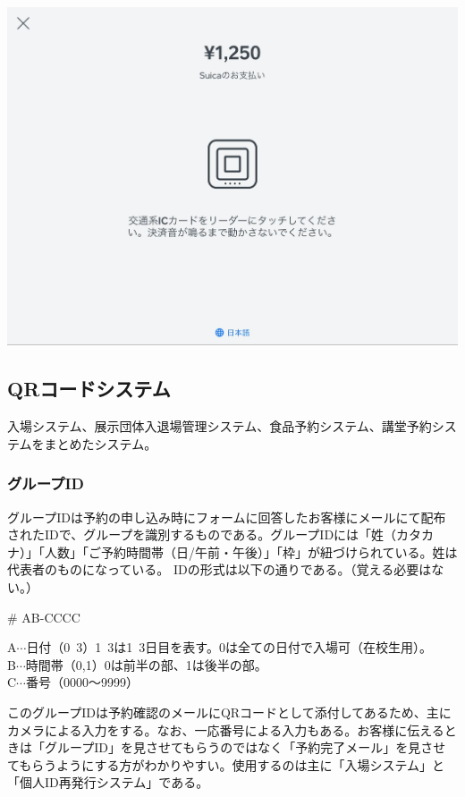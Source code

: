 \documentclass[dvipdfmx,jb5]{jarticle}
\begin{document}
\begin{enumerate}
\begin{enumerate}
\begin{enumerate}
     \includegraphics[scale=0.2]{assets/square_e-payment_scan.jpg}
    \end{enumerate}
   \end{enumerate}
  \end{enumerate}

\newpage
\subsection{QRコードシステム}
入場システム、展示団体入退場管理システム、食品予約システム、講堂予約システムをまとめたシステム。
\subsubsection{グループID}
グループIDは予約の申し込み時にフォームに回答したお客様にメールにて配布されたIDで、グループを識別するものである。グループIDには「姓（カタカナ）」「人数」「ご予約時間帯（日/午前・午後）」「枠」が紐づけられている。姓は代表者のものになっている。
IDの形式は以下の通りである。（覚える必要はない。）
\begin{screen}
 \begin{center}
 {\huge \# AB-CCCC}\\
 \end{center}
A$\cdots$日付（0~3）1~3は1~3日目を表す。0は全ての日付で入場可（在校生用）。\\
B$\cdots$時間帯（0,1）0は前半の部、1は後半の部。\\
C$\cdots$番号（0000〜9999）
\end{screen}
 このグループIDは予約確認のメールにQRコードとして添付してあるため、主にカメラによる入力をする。なお、一応番号による入力もある。お客様に伝えるときは「グループID」を見させてもらうのではなく「予約完了メール」を見させてもらうようにする方がわかりやすい。使用するのは主に「入場システム」と「個人ID再発行システム」である。
\end{document}
